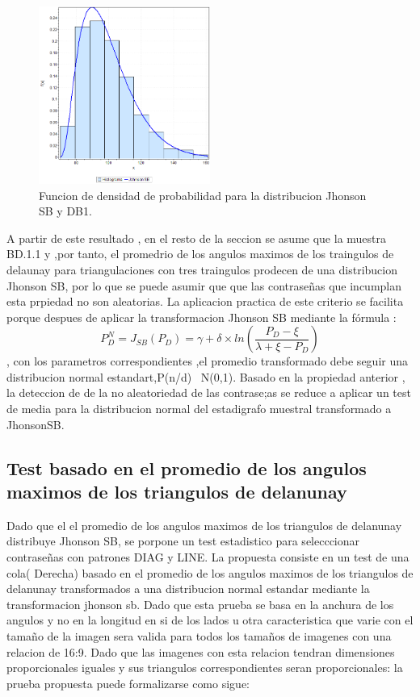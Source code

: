\documentclass[12pt]{report}
\begin{document}
	  	  	\begin{figure}[ht]
	  	\centering
	  	
	  	\includegraphics[width=0.5\textwidth]{3td_fdp.png}
	  	\caption{Funcion de densidad de probabilidad para la distribucion Jhonson SB y DB1.}
	  	\label{3TD_FDP}
	  \end{figure}
	  
	  
	 A partir de este resultado , en el resto de la seccion se asume que la muestra BD.1.1 y ,por tanto, el promedrio de los angulos maximos de los traingulos de delaunay para triangulaciones con tres traingulos prodecen de una distribucion Jhonson SB, por lo que se puede asumir que que las contraseñas que incumplan esta prpiedad no son aleatorias.
	 La aplicacion practica de este criterio se facilita porque despues de aplicar la transformacion Jhonson SB  mediante la fórmula :
	 \[
	 P_D^{N} = J_{SB}(P_D) = \gamma + \delta \times ln\left(\frac{P_D - \xi}{\lambda + \xi - P_D}\right)
	 \],
	 con los parametros correspondientes ,el promedio transformado debe seguir una distribucion normal estandart,P(n/d) ~N(0,1). Basado en la propiedad anterior , la deteccion de de la no aleatoriedad de las contrase;as se reduce a aplicar un test de media para la distribucion normal del estadigrafo muestral transformado a JhonsonSB.
	 
\subsection{Test basado en el promedio de los angulos maximos de los triangulos de delanunay}
Dado  que el el promedio de los angulos maximos de los triangulos de delanunay distribuye Jhonson SB, se porpone un  test estadistico para selecccionar contraseñas con patrones DIAG y LINE. La propuesta consiste en un test de una cola( Derecha) basado en el promedio de los angulos maximos de los triangulos de delanunay transformados a una distribucion normal estandar mediante la transformacion jhonson sb.
Dado que esta prueba se basa en la anchura de los angulos y no en la longitud en si de los lados u otra caracteristica que varie con el tamaño de la imagen sera valida para todos los tamaños de imagenes con una relacion de 16:9. Dado que las imagenes con esta relacion tendran dimensiones proporcionales iguales y sus triangulos correspondientes seran proporcionales: la prueba propuesta puede formalizarse como sigue:
\end{document}
